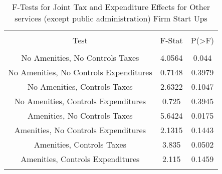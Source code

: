 
\begin{table}[!htbp] \centering 
  \caption{F-Tests for Joint Tax and Expenditure Effects for Other services (except public administration) Firm Start Ups} 
  \label{81Ftests} 
\begin{tabular}{@{\extracolsep{5pt}} ccc} 
\\[-1.8ex]\hline 
\hline \\[-1.8ex] 
Test & F-Stat & P(\textgreater F) \\ 
\hline \\[-1.8ex] 
No Amenities, No Controls Taxes & 4.0564 & 0.044 \\ 
No Amenities, No Controls Expenditures & 0.7148 & 0.3979 \\ 
No Amenities, Controls Taxes & 2.6322 & 0.1047 \\ 
No Amenities, Controls Expenditures & 0.725 & 0.3945 \\ 
Amenities, No Controls Taxes & 5.6424 & 0.0175 \\ 
Amenities, No Controls Expenditures & 2.1315 & 0.1443 \\ 
Amenities, Controls Taxes & 3.835 & 0.0502 \\ 
Amenities, Controls Expenditures & 2.115 & 0.1459 \\ 
\hline \\[-1.8ex] 
\end{tabular} 
\end{table} 
